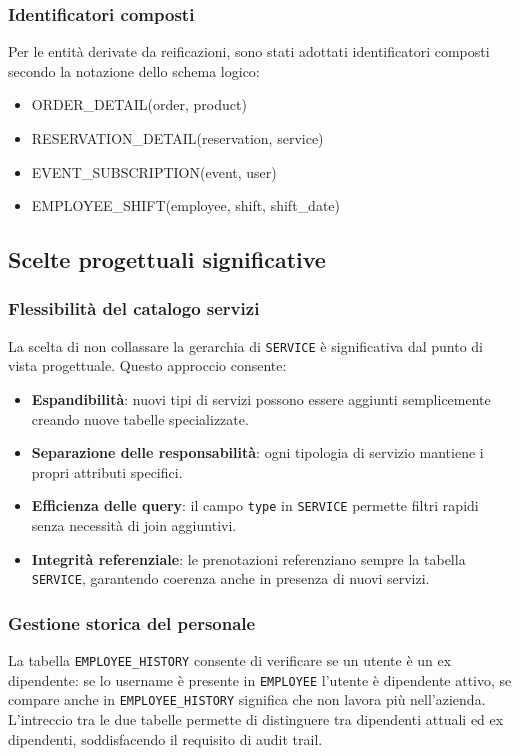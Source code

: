 \documentclass[a4paper,12pt]{report}
\begin{document}
\subsubsection{Identificatori composti}
Per le entità derivate da reificazioni, sono stati adottati
identificatori composti secondo la notazione dello schema logico:

\begin{itemize}
  \item ORDER\_DETAIL(order, product)
  \item RESERVATION\_DETAIL(reservation, service)
  \item EVENT\_SUBSCRIPTION(event, user)
  \item EMPLOYEE\_SHIFT(employee, shift, shift\_date)
\end{itemize}

\subsection{Scelte progettuali significative}

\subsubsection{Flessibilità del catalogo servizi}
La scelta di non collassare la gerarchia di \texttt{SERVICE} è
significativa dal punto di vista progettuale. Questo approccio consente:

\begin{itemize}
  \item \textbf{Espandibilità}: nuovi tipi di servizi possono essere
    aggiunti semplicemente creando nuove tabelle specializzate.
  \item \textbf{Separazione delle responsabilità}: ogni tipologia di
    servizio mantiene i propri attributi specifici.
  \item \textbf{Efficienza delle query}: il campo \texttt{type} in
    \texttt{SERVICE} permette filtri rapidi senza necessità di join aggiuntivi.
  \item \textbf{Integrità referenziale}: le prenotazioni referenziano
    sempre la tabella \texttt{SERVICE}, garantendo coerenza anche in
    presenza di nuovi servizi.
\end{itemize}

\subsubsection{Gestione storica del personale}
La tabella \texttt{EMPLOYEE\_HISTORY} consente di verificare se un
utente è un ex dipendente: se lo username è presente in
\texttt{EMPLOYEE} l'utente è dipendente attivo, se compare anche in
\texttt{EMPLOYEE\_HISTORY} significa che non lavora più nell'azienda.
L'intreccio tra le due tabelle permette di distinguere tra dipendenti
attuali ed ex dipendenti, soddisfacendo il requisito di audit trail.
\end{document}
